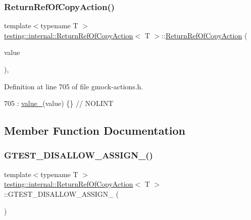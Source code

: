 \subsubsection{\texorpdfstring{Return\+Ref\+Of\+Copy\+Action()}{ReturnRefOfCopyAction()}}
{\footnotesize\ttfamily template$<$typename T $>$ \\
\hyperlink{classtesting_1_1internal_1_1ReturnRefOfCopyAction}{testing\+::internal\+::\+Return\+Ref\+Of\+Copy\+Action}$<$ T $>$\+::\hyperlink{classtesting_1_1internal_1_1ReturnRefOfCopyAction}{Return\+Ref\+Of\+Copy\+Action} (\begin{DoxyParamCaption}\item[{const T \&}]{value }\end{DoxyParamCaption})\hspace{0.3cm}{\ttfamily [inline]}, {\ttfamily [explicit]}}



Definition at line 705 of file gmock-\/actions.\+h.


\begin{DoxyCode}
705 : \hyperlink{classtesting_1_1internal_1_1ReturnRefOfCopyAction_a41fdd44b2021e01db916c6d5afcbf73f}{value\_}(value) \{\}  \textcolor{comment}{// NOLINT}
\end{DoxyCode}


\subsection{Member Function Documentation}
\mbox{\label{classtesting_1_1internal_1_1ReturnRefOfCopyAction_a767fa5d48c046e472eaf2353c2e7544c}} 
\subsubsection{\texorpdfstring{G\+T\+E\+S\+T\+\_\+\+D\+I\+S\+A\+L\+L\+O\+W\+\_\+\+A\+S\+S\+I\+G\+N\+\_\+()}{GTEST\_DISALLOW\_ASSIGN\_()}}
{\footnotesize\ttfamily template$<$typename T $>$ \\
\hyperlink{classtesting_1_1internal_1_1ReturnRefOfCopyAction}{testing\+::internal\+::\+Return\+Ref\+Of\+Copy\+Action}$<$ T $>$\+::G\+T\+E\+S\+T\+\_\+\+D\+I\+S\+A\+L\+L\+O\+W\+\_\+\+A\+S\+S\+I\+G\+N\+\_\+ (\begin{DoxyParamCaption}\item[{\hyperlink{classtesting_1_1internal_1_1ReturnRefOfCopyAction}{Return\+Ref\+Of\+Copy\+Action}$<$ T $>$}]{ }\end{DoxyParamCaption})\hspace{0.3cm}{\ttfamily [private]}}

